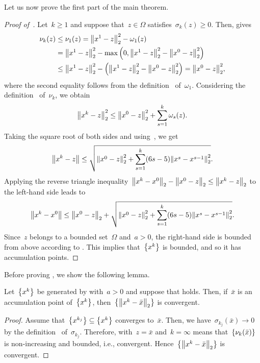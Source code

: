 \documentclass[../main]{subfiles}
\begin{document}
Let us now prove the first part of the main theorem.
\begin{proof}[Proof of~]
    Let~$k \ge 1$ and suppose that~$z \in \Omega$ satisfies~$\sigma_k(z) \ge 0$.
    Then,  gives
    \begin{align}
            \nu_k(z) &\le \nu_1(z) = \norm*{x^1 - z}_2^2 - \omega_1(z) \\
                           &= \norm*{x^1 - z}_2^2 - \max \left( 0, \norm*{x^1 - z}_2^2 - \norm*{x^0 - z}_2^2 \right) \\
                           &\le \norm*{x^1 - z}_2^2 - \left( \norm*{x^1 - z}_2^2 - \norm*{x^0 - z}_2^2 \right) = \norm*{x^0 - z}_2^2
    ,\end{align} 
    where the second equality follows from the definition~ of~$\omega_1$.
    Considering the definition~ of~$\nu_k$, we obtain
    \begin{equation}
        \norm*{x^k - z}_2^2 \le \norm*{x^0 - z}_2^2 + \sum_{s = 1}^{k} \omega_s(z)
    .\end{equation} 
    Taking the square root of both sides and using~, we get
    \begin{equation}
        \norm*{x^k - z} \le \sqrt{ \norm*{x^0 - z}_2^2 + \sum_{s = 1}^{k} (6s - 5) \norm*{x^s - x^{s - 1}}_2^2 }
    .\end{equation} 
    Applying the reverse triangle inequality~$\norm*{x^k - x^0}_2 - \norm*{x^0 - z}_2 \le \norm*{x^k - z}_2$ to the left-hand side leads to
    \begin{equation}
        \norm*{x^k - x^0} \le \norm*{x^0 - z}_2 + \sqrt{ \norm*{x^0 - z}_2^2 + \sum_{s = 1}^{k} (6s - 5) \norm*{x^s - x^{s - 1}}_2^2 }
    .\end{equation}
    Since~$z$ belongs to a bounded set~$\Omega$ and~$a > 0$, the right-hand side is bounded from above according to .
    This implies that~$\set*{x^k}$ is bounded, and so it has accumulation points.
\end{proof}

Before proving , we show the following lemma.
\begin{lemma} 
    Let~$\set*{x^k}$ be generated by  with~$a > 0$ and suppose that  holds.
    Then, if~$\bar{x}$ is an accumulation point of~$\set*{x^k}$, then~$\set*{\norm*{x^k - \bar{x}}_2}$ is convergent.
\end{lemma}
\begin{proof}
    Assume that~$\set*{x^{k_j}} \subseteq \set*{x^k}$ converges to~$\bar{x}$.
    Then, we have~$\sigma_{k_j}(\bar{x}) \to 0$ by the definition~ of~$\sigma_{k_j}$.
    Therefore,  with~$z = \bar{x}$ and~$k = \infty$ means that~$\set*{\nu_k(\bar{x})}$ is non-increasing and bounded, i.e., convergent.
    Hence~$\set*{\norm*{x^k - \bar{x}}_2}$ is convergent.
\end{proof}
\end{document}
